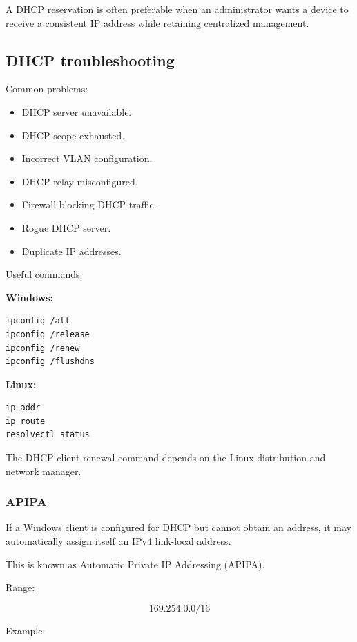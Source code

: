 A DHCP reservation is often preferable when an administrator wants a device to receive a consistent IP address while retaining centralized management.

\subsection{DHCP troubleshooting}

Common problems:

\begin{itemize}
\item DHCP server unavailable.
\item DHCP scope exhausted.
\item Incorrect VLAN configuration.
\item DHCP relay misconfigured.
\item Firewall blocking DHCP traffic.
\item Rogue DHCP server.
\item Duplicate IP addresses.
\end{itemize}

Useful commands:

\textbf{Windows:}

\begin{lstlisting}
ipconfig /all
ipconfig /release
ipconfig /renew
ipconfig /flushdns
\end{lstlisting}

\textbf{Linux:}

\begin{lstlisting}
ip addr
ip route
resolvectl status
\end{lstlisting}

The DHCP client renewal command depends on the Linux distribution and network manager.

\subsubsection{APIPA}

If a Windows client is configured for DHCP but cannot obtain an address, it may automatically assign itself an IPv4 link-local address.

This is known as Automatic Private IP Addressing (APIPA).

Range:



\[
\boxed{169.254.0.0/16}
\]



Example:

